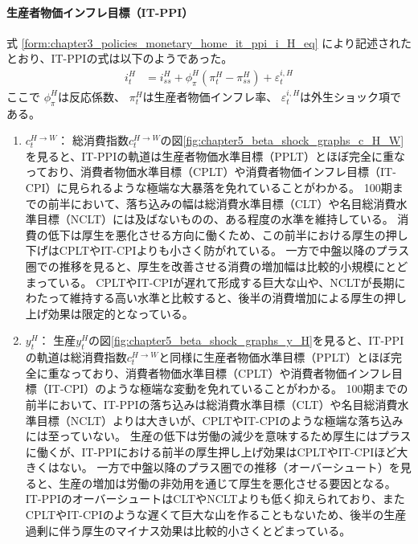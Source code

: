 \paragraph{生産者物価インフレ目標（IT-PPI）}
\label{sec:chapter5_beta_shock_policies_it_ppi}
式
\eqref{form:chapter3_policies_monetary_home_it_ppi_i_H_eq}
により記述されたとおり、IT-PPIの式は以下のようであった。
\begin{align}
\label{form:chapter5_beta_shock_policies_it_ppi_i_H_eq}
    i_t^H&=i_{ss}^H+\phi_{\pi}^H(\pi_t^H-\pi_{ss}^H)+\varepsilon_t^{i,H}
\end{align}
ここで
\(\phi_{\pi}^H\)は反応係数、
\(\pi_t^H\)は生産者物価インフレ率、
\(\varepsilon_t^{i,H}\)は外生ショック項である。
\begin{enumerate}
    \item
    \label{itm:chapter5_beta_shock_policies_it_ppi_c_H_W}
        \(c_t^{H\to W}\)：
        総消費指数\(c_t^{H\to W}\)の図\ref{fig:chapter5_beta_shock_graphs_c_H_W}を見ると、IT-PPIの軌道は生産者物価水準目標（PPLT）とほぼ完全に重なっており、消費者物価水準目標（CPLT）や消費者物価インフレ目標（IT-CPI）に見られるような極端な大暴落を免れていることがわかる。
        100期までの前半において、落ち込みの幅は総消費水準目標（CLT）や名目総消費水準目標（NCLT）には及ばないものの、ある程度の水準を維持している。
        消費の低下は厚生を悪化させる方向に働くため、この前半における厚生の押し下げはCPLTやIT-CPIよりも小さく防がれている。
        一方で中盤以降のプラス圏での推移を見ると、厚生を改善させる消費の増加幅は比較的小規模にとどまっている。
        CPLTやIT-CPIが遅れて形成する巨大な山や、NCLTが長期にわたって維持する高い水準と比較すると、後半の消費増加による厚生の押し上げ効果は限定的となっている。
    \item
    \label{itm:chapter5_beta_shock_policies_it_ppi_y_H}
        \(y_t^H\)：
        生産\(y_t^H\)の図\ref{fig:chapter5_beta_shock_graphs_y_H}を見ると、IT-PPIの軌道は総消費指数\(c_t^{H\to W}\)と同様に生産者物価水準目標（PPLT）とほぼ完全に重なっており、消費者物価水準目標（CPLT）や消費者物価インフレ目標（IT-CPI）のような極端な変動を免れていることがわかる。
        100期までの前半において、IT-PPIの落ち込みは総消費水準目標（CLT）や名目総消費水準目標（NCLT）よりは大きいが、CPLTやIT-CPIのような極端な落ち込みには至っていない。
        生産の低下は労働の減少を意味するため厚生にはプラスに働くが、IT-PPIにおける前半の厚生押し上げ効果はCPLTやIT-CPIほど大きくはない。
        一方で中盤以降のプラス圏での推移（オーバーシュート）を見ると、生産の増加は労働の非効用を通じて厚生を悪化させる要因となる。
        IT-PPIのオーバーシュートはCLTやNCLTよりも低く抑えられており、またCPLTやIT-CPIのような遅くて巨大な山を作ることもないため、後半の生産過剰に伴う厚生のマイナス効果は比較的小さくとどまっている。

\end{enumerate}
